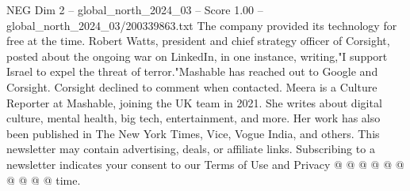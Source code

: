 \begin{textsample}{NEG Dim 2 – global\_north\_2024\_03 – Score 1.00 – global\_north\_2024\_03/200339863.txt}
The company provided its technology for free at the time.
Robert Watts, president and chief strategy officer of Corsight, posted about the ongoing war on LinkedIn, in one instance, writing,"I support Israel to expel the threat of terror."Mashable has reached out to Google and Corsight.
Corsight declined to comment when contacted.
Meera is a Culture Reporter at Mashable, joining the UK team in 2021.
She writes about digital culture, mental health, big tech, entertainment, and more.
Her work has also been published in The New York Times, Vice, Vogue India, and others.
This newsletter may contain advertising, deals, or affiliate links.
Subscribing to a newsletter indicates your consent to our Terms of Use and Privacy @ @ @ @ @ @ @ @ @ @ time.

\end{textsample}
